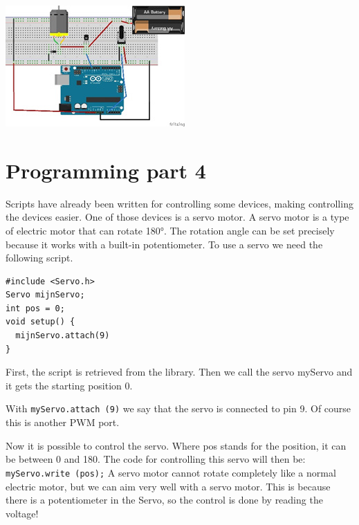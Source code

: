 \documentclass{arduino}
\begin{document}
\begin{center}
\includegraphics[width=0.8\linewidth]{33. Circuit motor control (large current)}
\end{center}

\newpage

\section{Programming part 4}


Scripts have already been written for controlling some devices, making controlling the devices easier. One of those devices is a servo motor. A servo motor is a type of electric motor that can rotate \ang{180}. The rotation angle can be set precisely because it works with a built-in potentiometer. To use a servo we need the following script.

\begin{lstlisting}
#include <Servo.h>
Servo mijnServo;
int pos = 0;
void setup() {
  mijnServo.attach(9)
}
\end{lstlisting}

First, the script is retrieved from the library. Then we call the servo myServo and it gets the starting position 0.

With \lstinline{myServo.attach (9)} we say that the servo is connected to pin 9. Of course this is another PWM port.

Now it is possible to control the servo. Where pos stands for the position, it can be between 0 and 180. The code for controlling this servo will then be: \lstinline{myServo.write (pos);} A servo motor cannot rotate completely like a normal electric motor, but we can aim very well with a servo motor. This is because there is a potentiometer in the Servo, so the control is done by reading the voltage!
\end{document}
